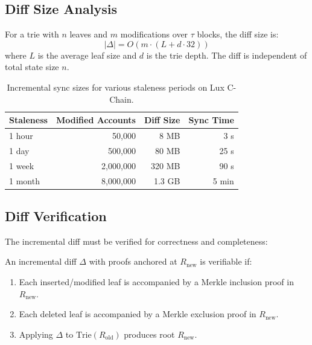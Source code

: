 \subsection{Diff Size Analysis}

\begin{proposition}
For a trie with $n$ leaves and $m$ modifications over $\tau$ blocks, the diff size is:
\begin{equation}
    |\Delta| = O(m \cdot (L + d \cdot 32))
\end{equation}
where $L$ is the average leaf size and $d$ is the trie depth. The diff is independent of total state size $n$.
\end{proposition}

\begin{table}[H]
\centering
\caption{Incremental sync sizes for various staleness periods on Lux C-Chain.}
\label{tab:incremental}
\begin{tabular}{lrrr}
\toprule
\textbf{Staleness} & \textbf{Modified Accounts} & \textbf{Diff Size} & \textbf{Sync Time} \\
\midrule
1 hour & 50,000 & 8 MB & 3 s \\
1 day & 500,000 & 80 MB & 25 s \\
1 week & 2,000,000 & 320 MB & 90 s \\
1 month & 8,000,000 & 1.3 GB & 5 min \\
\bottomrule
\end{tabular}
\end{table}

\subsection{Diff Verification}

The incremental diff must be verified for correctness and completeness:

\begin{theorem}
An incremental diff $\Delta$ with proofs anchored at $R_{\text{new}}$ is verifiable if:
\begin{enumerate}
    \item Each inserted/modified leaf is accompanied by a Merkle inclusion proof in $R_{\text{new}}$.
    \item Each deleted leaf is accompanied by a Merkle exclusion proof in $R_{\text{new}}$.
    \item Applying $\Delta$ to $\text{Trie}(R_{\text{old}})$ produces root $R_{\text{new}}$.
\end{enumerate}
\end{theorem}

